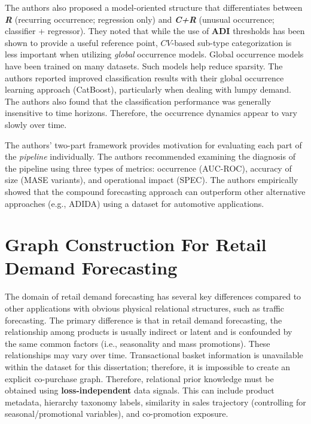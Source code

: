 The authors also proposed a model-oriented structure that differentiates between \textbf{\textit{R}} (recurring occurrence; regression only) and \textbf{\textit{C+R}} (unusual occurrence; classifier + regressor). They noted that while the use of \textbf{ADI} thresholds has been shown to provide a useful reference point, $CV$-based sub-type categorization is less important when utilizing \emph{global} occurrence models. Global occurrence models have been trained on many datasets. Such models help reduce sparsity. The authors reported improved classification results with their global occurrence learning approach (CatBoost), particularly when dealing with lumpy demand. The authors also found that the classification performance was generally insensitive to time horizons. Therefore, the occurrence dynamics appear to vary slowly over time.

The authors' two-part framework provides motivation for evaluating each part of the \emph{pipeline} individually. The authors recommended examining the diagnosis of the pipeline using three types of metrics: occurrence (AUC-ROC), accuracy of size (MASE variants), and operational impact (SPEC). The authors empirically showed that the compound forecasting approach can outperform other alternative approaches (e.g., ADIDA) using a dataset for automotive applications.




    


\section{Graph Construction For Retail Demand Forecasting} 
\label{sec:sota-graph-construction}

The domain of retail demand forecasting has several key differences compared to other applications with obvious physical relational structures, such as traffic forecasting. The primary difference is that in retail demand forecasting, the relationship among products is usually indirect or latent and is confounded by the same common factors (i.e., seasonality and mass promotions). These relationships may vary over time. Transactional basket information is unavailable within the dataset for this dissertation; therefore, it is impossible to create an explicit co-purchase graph. Therefore, relational prior knowledge must be obtained using \textbf{loss-independent} data signals. This can include product metadata, hierarchy taxonomy labels, similarity in sales trajectory (controlling for seasonal/promotional variables), and co-promotion exposure.

